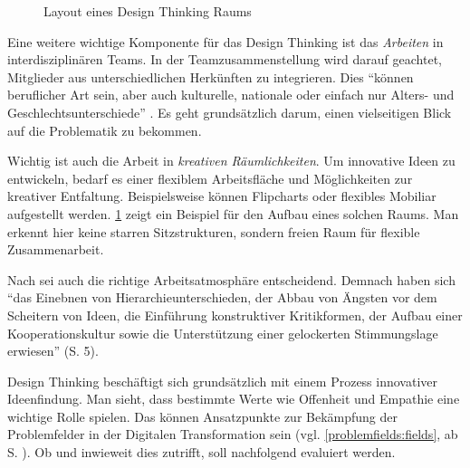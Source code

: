 \begin{figure}[H]
	\centering
	\caption[Layout eines Design Thinking Raums]{Layout eines Design Thinking Raums \protect \cite[S. 4]{lewrick_design_2018}}
	\label{fig:designthinkingroom}
\end{figure}

Eine weitere wichtige Komponente für das Design Thinking ist das \textit{Arbeiten} in interdisziplinären Teams. In der Teamzusammenstellung wird darauf geachtet, Mitglieder aus unterschiedlichen Herkünften zu integrieren. Dies ``können beruflicher Art sein, aber auch kulturelle, nationale oder einfach nur Alters- und Geschlechtsunterschiede'' \cite[S. 3]{lewrick_design_2018}. Es geht grundsätzlich darum, einen vielseitigen Blick auf die Problematik zu bekommen.

Wichtig ist auch die Arbeit in \textit{kreativen Räumlichkeiten}. Um innovative Ideen zu entwickeln, bedarf es einer flexiblem Arbeitsfläche und Möglichkeiten zur kreativer Entfaltung. Beispielsweise können Flipcharts oder flexibles Mobiliar aufgestellt werden. \ref{fig:designthinkingroom} zeigt ein Beispiel für den Aufbau eines solchen Raums. Man erkennt hier keine starren Sitzstrukturen, sondern freien Raum für flexible Zusammenarbeit.

Nach  sei auch die richtige Arbeitsatmosphäre entscheidend. Demnach haben sich ``das Einebnen von Hierarchieunterschieden, der Abbau von Ängsten vor dem Scheitern von Ideen, die Einführung konstruktiver Kritikformen, der Aufbau einer Kooperationskultur sowie die Unterstützung einer gelockerten Stimmungslage erwiesen'' (S. 5).

Design Thinking beschäftigt sich grundsätzlich mit einem Prozess innovativer Ideenfindung. Man sieht, dass bestimmte Werte wie Offenheit und Empathie eine wichtige Rolle spielen. Das können Ansatzpunkte zur Bekämpfung der Problemfelder in der Digitalen Transformation sein (vgl. \ref{problemfields:fields}, ab S. \pageref{problemfields:fields}). Ob und inwieweit dies zutrifft, soll nachfolgend evaluiert werden.

